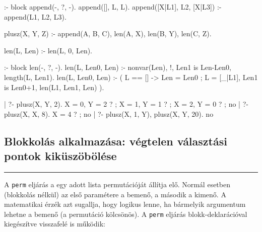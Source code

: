 \begin{prologcode}
:- block append(-, ?, -).
append([], L, L).
append([X|L1], L2, [X|L3]) :-
    append(L1, L2, L3).
\end{prologcode}

\label{plusz3}
\begin{prologcode}
plusz(X, Y, Z) :-
        append(A, B, C),
        len(A, X),
        len(B, Y),
        len(C, Z).

len(L, Len) :-
        len(L, 0, Len).

:- block len(-, ?, -).
len(L, Len0, Len) :-
        nonvar(Len), !, Len1 is Len-Len0, 
        length(L, Len1).
len(L, Len0, Len) :- 
        (   L == [] -> Len = Len0
        ;   L = [_|L1],
            Len1 is Len0+1, len(L1, Len1, Len)
        ).

| ?- plusz(X, Y, 2).
X = 0, Y = 2 ? ;
X = 1, Y = 1 ? ;
X = 2, Y = 0 ? ;
no
| ?- plusz(X, X, 8).
X = 4 ? ;
no
| ?- plusz(X, 1, Y), plusz(X, Y, 20).
no
\end{prologcode}

\subsection{Blokkolás alkalmazása: végtelen választási pontok kiküszöbölése}
\br

\hspace*{3mm}\rule[-5ex]{0.3mm}{11ex}\hspace*{-3mm}

\br

A {\tt perm} eljárás a egy adott lista permutációját állítja
elő. Normál esetben (blokkolás nélkül) az első paramétere a
bemenő, a második a kimenő. A matematikai érzék azt sugallja,
hogy logikus lenne, ha bármelyik argumentum lehetne a bemenő (a
permutáció kölcsönös). A {\tt perm} eljárás
blokk-deklarációval kiegészítve visszafelé is működik:

